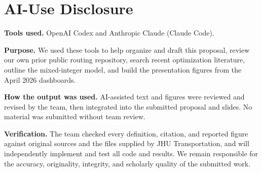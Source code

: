 \documentclass{article}
\begin{document}
\vskip -0.1in
\section{AI-Use Disclosure}
\vskip -0.1in

\textbf{Tools used.} OpenAI Codex and Anthropic Claude (Claude Code).

\textbf{Purpose.} We used these tools to help organize and draft this proposal, review our own prior public routing repository, search recent optimization literature, outline the mixed-integer model, and build the presentation figures from the April 2026 dashboards.

\textbf{How the output was used.} AI-assisted text and figures were reviewed and revised by the team, then integrated into the submitted proposal and slides. No material was submitted without team review.

\textbf{Verification.} The team checked every definition, citation, and reported figure against original sources and the files supplied by JHU Transportation, and will independently implement and test all code and results. We remain responsible for the accuracy, originality, integrity, and scholarly quality of the submitted work.
\end{document}
